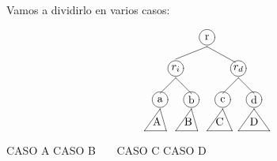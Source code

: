 \documentclass[10pt,a4paper,spanish]{report}
\begin{document}
\noindent
Vamos a dividirlo en varios casos:

\begin{center}
\[\begin{xy}
,(0,0)*+=[o]=<0.5cm>[F]\txt<0.5cm>{r}
,(-10,-10)*+=[o]=<0.5cm>[F]\txt<2cm>{$r_i$}
,(10,-10)*+=[o]=<0.5cm>[F]\txt<2cm>{$r_d$}
,(-15,-20)*+=[o]=<0.5cm>[F]\txt<2cm>{a}
,(-5,-20)*+=[o]=<0.5cm>[F]\txt<2cm>{b}
,(5,-20)*+=[o]=<0.5cm>[F]\txt<2cm>{c}
,(15,-20)*+=[o]=<0.5cm>[F]\txt<2cm>{d}
,(-16,-27)*+=<0.5cm>[]\txt<1cm>{A}
,(-6,-27)*+=<0.5cm>[]\txt<1cm>{B}
,(15,-27)*+=<0.5cm>[]\txt<1cm>{D}
,(4,-27)*+=<0.5cm>[]\txt<1cm>{C}

\ar@{-} (0,-3);(-10,-7) %
\ar@{-} (0,-3);(9,-8) %
\ar@{-} (-10,-13);(-15,-18) %
\ar@{-} (10,-13);(5,-18) %
\ar@{-} (10,-13);(15,-18) %
\ar@{-} (-15,-23);(-20,-30)
\ar@{-} (-15,-23);(-13,-30)
\ar@{-} (-20,-30);(-13,-30)
\ar@{-} (-10,-13);(-5,-18) %
\ar@{-} (-5,-23);(-10,-30) %
\ar@{-} (15,-23);(10,-30) %
\ar@{-} (15,-23);(20,-30)
\ar@{-} (10,-30);(20,-30)
\ar@{-} (-5,-23);(-3,-30) %
\ar@{-} (-10,-30);(-3,-30)
\ar@{-} (5,-23);(0,-30)
\ar@{-} (5,-23);(8,-30)
\ar@{-} (0,-30);(8,-30)
\end{xy}\]
\end{center}

\begin{center}
{\tiny CASO A CASO B $\quad\ $ CASO C CASO D}
\end{center}
\end{document}
